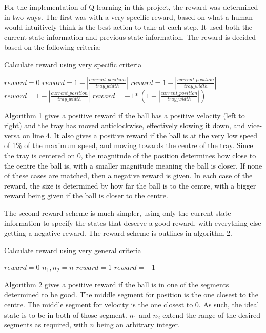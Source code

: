 \documentclass[12pt,a4paper]{article}
\begin{document}
For the implementation of Q-learning in this project, the reward was determined in two ways. The first was with a very specific reward, based on what a human would intuitively think is the best action to take at each step. It used both the current state information and previous state information. The reward is decided based on the following criteria:
\begin{algorithm}[H]
	\caption{Calculate reward using very specific criteria}
	\label{ql_specific}
	\begin{algorithmic}[1]
		\State $reward = 0$
			\State $reward = 1 - |\frac{current\_position}{tray\_width}|$
			\State $reward = 1 - |\frac{current\_position}{tray\_width}|$
			\State $reward = 1 - |\frac{current\_position}{tray\_width}|$
		\Else 
			\State $reward = -1 * (1 -|\frac{current\_position}{tray\_width}|)$
		\EndIf
	\end{algorithmic}
\end{algorithm}
Algorithm 1 gives a positive reward if the ball has a positive velocity (left to right) and the tray has moved anticlockwise, effectively slowing it down, and vice-versa on line 4. It also gives a positive reward if the ball is at the very low speed of 1\% of the maximum speed, and moving towards the centre of the tray. Since the tray is centered on 0, the magnitude of the position determines how close to the centre the ball is, with a smaller magnitude meaning the ball is closer. If none of these cases are matched, then a negative reward is given. In each case of the reward, the size is determined by how far the ball is to the centre, with a bigger reward being given if the ball is closer to the centre.

The second reward scheme is much simpler, using only the current state information to specify the states that deserve a good reward, with everything else getting a negative reward. The reward scheme is outlines in algorithm 2.

\begin{algorithm}[H]
	\caption{Calculate reward using very general criteria}
	\label{ql_general}
	\begin{algorithmic}[1]
		\State $reward = 0$
		\State $n_1, n_2 = n$
			\State $reward = 1$
		\Else 
			\State $reward = -1$
		\EndIf
	\end{algorithmic}
\end{algorithm}
Algorithm 2 gives a positive reward if the ball is in one of the segments determined to be good. The middle segment for position is the one closest to the centre. The middle segment for velocity is the one closest to 0. As such, the ideal state is to be in both of those segment. $n_1$ and $n_2$ extend the range of the desired segments as required, with $n$ being an arbitrary integer.
\end{document}
